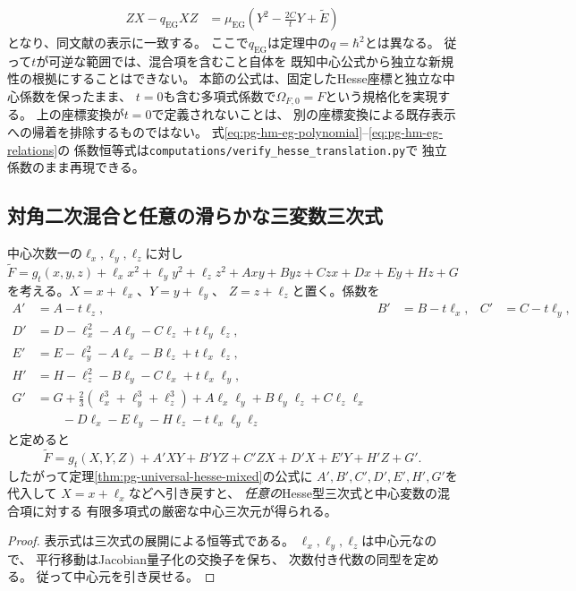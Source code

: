 \begin{remark}
\begin{equation}
\begin{aligned}
 ZX-q_{\mathrm{EG}}XZ
 &=\mu_{\mathrm{EG}}\left(Y^2-\frac{2C}{t}Y+\widetilde E\right)
 \end{aligned}
 \label{eq:pg-hm-eg-relations}
\end{equation}
となり、同文献の表示に一致する。
ここで$q_{\mathrm{EG}}$は定理中の$q=\hbar^2$とは異なる。
従って$t$が可逆な範囲では、混合項を含むこと自体を
既知中心公式から独立な新規性の根拠にすることはできない。
本節の公式は、固定したHesse座標と独立な中心係数を保ったまま、
$t=0$も含む多項式係数で$\Omega_{F,0}=F$という規格化を実現する。
上の座標変換が$t=0$で定義されないことは、
別の座標変換による既存表示への帰着を排除するものではない。
式\eqref{eq:pg-hm-eg-polynomial}--\eqref{eq:pg-hm-eg-relations}の
係数恒等式は\texttt{computations/verify\_hesse\_translation.py}で
独立係数のまま再現できる。
\end{remark}

\subsection{対角二次混合と任意の滑らかな三変数三次式}

\begin{corollary}[全ての中心混合項を含むHesse型]
\label{cor:pg-universal-hesse-all-mixed}
中心次数一の$\ell_x,\ell_y,\ell_z$に対し
\begin{equation}
 \widetilde F=g_t(x,y,z)
 +\ell_xx^2+\ell_yy^2+\ell_zz^2
 +Axy+Byz+Czx+Dx+Ey+Hz+G
\end{equation}
を考える。$X=x+\ell_x$、$Y=y+\ell_y$、
$Z=z+\ell_z$と置く。係数を
\begin{equation}
\begin{aligned}
 A'&=A-t\ell_z,& B'&=B-t\ell_x,& C'&=C-t\ell_y,\\
 D'&=D-\ell_x^2-A\ell_y-C\ell_z+t\ell_y\ell_z,\\
 E'&=E-\ell_y^2-A\ell_x-B\ell_z+t\ell_x\ell_z,\\
 H'&=H-\ell_z^2-B\ell_y-C\ell_x+t\ell_x\ell_y,\\
 G'&=G+\tfrac23(\ell_x^3+\ell_y^3+\ell_z^3)
 +A\ell_x\ell_y+B\ell_y\ell_z+C\ell_z\ell_x\\
 &\qquad-D\ell_x-E\ell_y-H\ell_z
 -t\ell_x\ell_y\ell_z
\end{aligned}
\label{eq:pg-hm-translation}
\end{equation}
と定めると
\begin{equation}
 \widetilde F
 =g_t(X,Y,Z)+A'XY+B'YZ+C'ZX+D'X+E'Y+H'Z+G'.
\end{equation}
したがって定理\ref{thm:pg-universal-hesse-mixed}の公式に
$A',B',C',D',E',H',G'$を代入して
$X=x+\ell_x$などへ引き戻すと、
\emph{任意の}Hesse型三次式と中心変数の混合項に対する
有限多項式の厳密な中心三次元が得られる。
\end{corollary}
\begin{proof}
表示式は三次式の展開による恒等式である。
$\ell_x,\ell_y,\ell_z$は中心元なので、
平行移動はJacobian量子化の交換子を保ち、
次数付き代数の同型を定める。
従って中心元を引き戻せる。
\end{proof}

